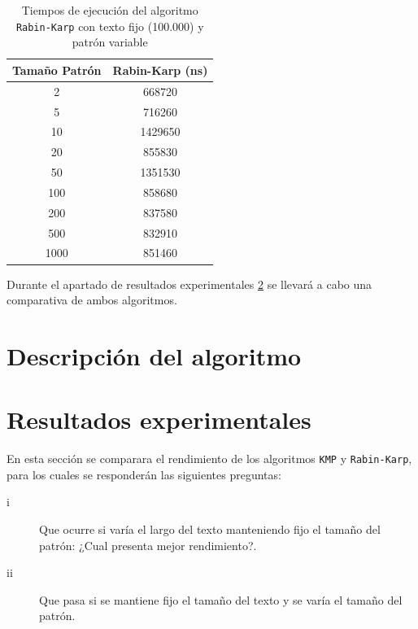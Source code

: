 \documentclass[12pt]{article}
\begin{document}
	\begin{table}[H]
		\centering
		\begin{tabular}{|c|c|}
			\hline
			\textbf{Tamaño Patrón} & \textbf{Rabin-Karp (ns)} \\
			\hline
			2     & 668720  \\
			5     & 716260  \\
			10    & 1429650  \\
			20    & 855830  \\
			50    & 1351530  \\
			100   & 858680  \\
			200   & 837580  \\
			500   & 832910  \\
			1000  & 851460  \\
			\hline
		\end{tabular}
		\caption{Tiempos de ejecución del algoritmo \texttt{Rabin-Karp} con texto fijo (100.000) y patrón variable}
		\label{tab:Rabin-Karp_patron}
	\end{table}
	
	Durante el apartado de resultados experimentales \ref{resultados_experimentales} se llevará a cabo una comparativa de ambos algoritmos.
	
	\section{Descripción del algoritmo}
	
	\section{Resultados experimentales}
	\label{resultados_experimentales}\textbf{}
	
	En esta sección se comparara el rendimiento de los algoritmos \texttt{KMP} y \texttt{Rabin-Karp}, para los cuales se responderán las siguientes preguntas:
	
	\begin{description}
		\item[i] Que ocurre si varía el largo del texto manteniendo fijo el tamaño del patrón: ¿Cual presenta mejor rendimiento?.
		\item[ii] Que pasa si se mantiene fijo el tamaño del texto y se varía el tamaño del patrón.
	\end{description}
	
\end{document}
